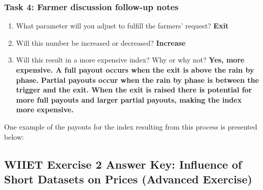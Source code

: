 \documentclass[letterpaper,10pt,english]{sphinxmanual}
\begin{document}
\subsubsection{Task 4: Farmer discussion follow-up notes}
\label{wiiet/wiiet_usingfarmerinformationanskey:task-4-farmer-discussion-follow-up-notes}\begin{enumerate}
\item {} 
What parameter will you adjust to fulfill the farmers' request? \textbf{Exit}

\item {} 
Will this number be increased or decreased? \textbf{Increase}

\item {} 
Will this result in a more expensive index? Why or why not? \textbf{Yes, more expensive. A full payout occurs when the exit is above the rain by phase. Partial payouts occur when the rain by phase is between the trigger and the exit. When the exit is raised there is potential for more full payouts and larger partial payouts, making the index more expensive.}

\end{enumerate}

One example of the payouts for the index resulting from this process is presented below:

{\hfill}


\subsection{WIIET Exercise 2 Answer Key: Influence of Short Datasets on Prices (Advanced Exercise)}
\label{wiiet/wiiet_influenceshortdatasetsanskey:wiiet-exercise-2-answer-key-influence-of-short-datasets-on-prices-advanced-exercise}\label{wiiet/wiiet_influenceshortdatasetsanskey::doc}
\end{document}
